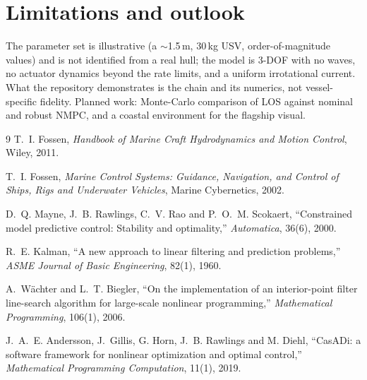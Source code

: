 \documentclass[10pt]{article}
\begin{document}
\section{Limitations and outlook}
The parameter set is illustrative (a $\sim$1.5\,m, 30\,kg USV,
order-of-magnitude values) and is not identified from a real hull; the
model is 3-DOF with no waves, no actuator dynamics beyond the rate limits,
and a uniform irrotational current. What the repository demonstrates is
the chain and its numerics, not vessel-specific fidelity. Planned work:
Monte-Carlo comparison of LOS against nominal and robust NMPC, and a
coastal environment for the flagship visual.

\begin{thebibliography}{9}
T.~I. Fossen, \emph{Handbook of Marine Craft Hydrodynamics and Motion
Control}, Wiley, 2011.

T.~I. Fossen, \emph{Marine Control Systems: Guidance, Navigation, and
Control of Ships, Rigs and Underwater Vehicles}, Marine Cybernetics, 2002.

D.~Q. Mayne, J.~B. Rawlings, C.~V. Rao and P.~O.~M. Scokaert,
``Constrained model predictive control: Stability and optimality,''
\emph{Automatica}, 36(6), 2000.

R.~E. Kalman, ``A new approach to linear filtering and prediction
problems,'' \emph{ASME Journal of Basic Engineering}, 82(1), 1960.

A.~W\"achter and L.~T. Biegler, ``On the implementation of an
interior-point filter line-search algorithm for large-scale nonlinear
programming,'' \emph{Mathematical Programming}, 106(1), 2006.

J.~A.~E. Andersson, J.~Gillis, G. Horn, J.~B. Rawlings and M. Diehl,
``CasADi: a software framework for nonlinear optimization and optimal
control,'' \emph{Mathematical Programming Computation}, 11(1), 2019.
\end{thebibliography}
\end{document}
